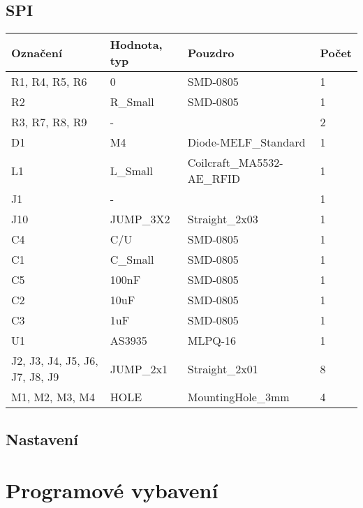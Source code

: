 \documentclass[12pt,a4paper,final,titlepage,twoside]{article}
\begin{document}
\subsection{SPI}

\begin{center}
  \begin{tabular}{ | l | l | l | l |}
    \hline
    Označení & Hodnota, typ & Pouzdro & Počet \\ \hline
    \hline
			R1, R4, R5, R6 & 0 & SMD-0805 & 1\\ \hline
			R2 & R\_Small & SMD-0805 & 1\\ \hline
			R3, R7, R8, R9 & - &  & 2\\ \hline
			D1 & M4 & Diode-MELF\_Standard & 1\\ \hline
			L1 & L\_Small & Coilcraft\_MA5532-AE\_RFID & 1\\ \hline
			J1 & - &  & 1\\ \hline
			J10 & JUMP\_3X2 & Straight\_2x03 & 1\\ \hline
			C4 & C/U & SMD-0805 & 1\\ \hline
			C1 & C\_Small & SMD-0805 & 1\\ \hline
			C5 & 100nF & SMD-0805 & 1\\ \hline
			C2 & 10uF & SMD-0805 & 1\\ \hline
			C3 & 1uF & SMD-0805 & 1\\ \hline
			U1 & AS3935 & MLPQ-16 & 1\\ \hline
			J2, J3, J4, J5, J6, J7, J8, J9 & JUMP\_2x1 & Straight\_2x01 & 8\\ \hline
			M1, M2, M3, M4 & HOLE & MountingHole\_3mm & 4\\ \hline	
  \end{tabular}
\end{center}


\subsection{Nastavení}

\section{Programové vybavení}


\end{document}
